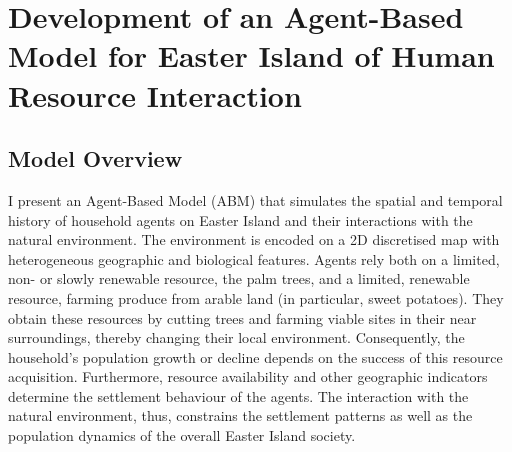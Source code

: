 \chapter{Development of an Agent-Based Model for Easter Island of Human Resource Interaction}\label{chapter:Methods}
\FloatBarrier
\section{Model Overview}
I present an Agent-Based Model (ABM) that simulates the spatial and temporal history of household agents on Easter Island and their interactions with the natural environment. 
The environment is encoded on a 2D discretised map with heterogeneous geographic and biological features.
Agents rely both on a limited, non- or slowly renewable resource, the palm trees, and a limited, renewable resource, farming produce from arable land (in particular, sweet potatoes). 
They obtain these resources by cutting trees and farming viable sites in their near surroundings, thereby changing their local environment.
Consequently, the household's population growth or decline depends on the success of this resource acquisition. 
Furthermore, resource availability and other geographic indicators determine the settlement behaviour of the agents.
The interaction with the natural environment, thus, constrains the settlement patterns as well as the population dynamics of the overall Easter Island society.

